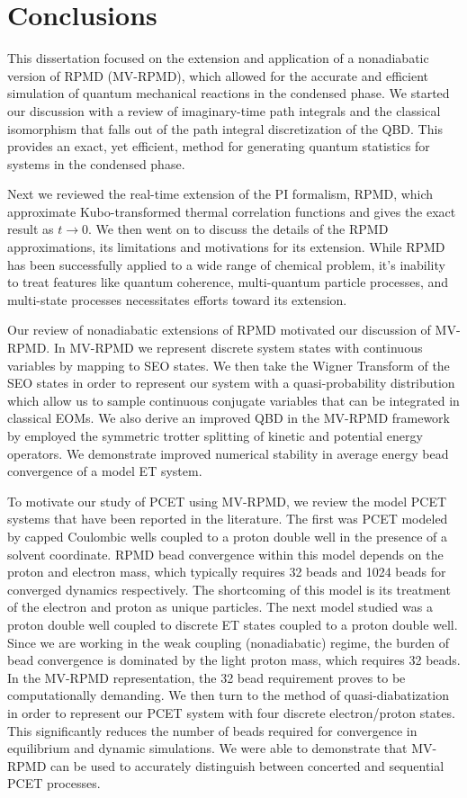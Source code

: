\documentclass[phd,tocprelim]{cornell}
\begin{document}
\chapter{Conclusions }
This dissertation focused on the extension and application of a nonadiabatic version of RPMD (MV-RPMD), which allowed for the accurate and efficient simulation of quantum mechanical reactions in the condensed phase. We started our discussion with a review of imaginary-time path integrals and the classical isomorphism that falls out of the path integral discretization of the QBD. This provides an exact, yet efficient, method for generating quantum statistics for systems in the condensed phase. 

Next we reviewed the real-time extension of the PI formalism, RPMD, which approximate Kubo-transformed thermal correlation functions and gives the exact result as $t\to0$. We then went on to discuss the details of the RPMD approximations, its limitations and motivations for its extension. While RPMD has been successfully applied to a wide range of chemical problem, it's inability to treat features like quantum coherence, multi-quantum particle processes, and multi-state processes necessitates efforts toward its extension. 


Our review of nonadiabatic extensions of RPMD motivated our discussion of MV-RPMD. In MV-RPMD we represent discrete system states with continuous variables by mapping to SEO states. We then take the Wigner Transform of the SEO states in order to represent our system with a quasi-probability distribution which allow us to sample continuous conjugate variables that can be integrated in classical EOMs. We also derive an improved QBD in the MV-RPMD framework by employed the symmetric trotter splitting of kinetic and potential energy operators. We demonstrate improved numerical stability in average energy bead convergence of a model ET system. 


To motivate our study of PCET using MV-RPMD, we review the model PCET systems that have been reported in the literature. The first was PCET modeled by capped Coulombic wells coupled to a proton double well in the presence of a solvent coordinate. RPMD bead convergence within this model depends on the proton and electron mass, which typically requires 32 beads and 1024 beads for converged dynamics respectively. The shortcoming of this model is its treatment of the electron and proton as unique particles. The next model studied was a proton double well coupled to discrete ET states coupled to a proton double well. Since we are working in the weak coupling (nonadiabatic) regime, the burden of bead convergence is dominated by the light proton mass, which requires 32 beads. In the MV-RPMD representation, the 32 bead requirement proves to be computationally demanding. We then turn to the method of quasi-diabatization in order to represent our PCET system with four discrete electron/proton states. This significantly reduces the number of beads required for convergence in equilibrium and dynamic simulations. We were able to demonstrate that MV-RPMD can be used to accurately distinguish between concerted and sequential PCET processes. 
\end{document}
